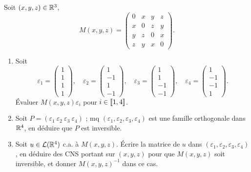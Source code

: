 

\begin{statementbox}
Soit $(x,y,z)\in\mathbb R^3$,
\[
M(x,y,z)=
\begin{pmatrix}
0&x&y&z\\
x&0&z&y\\
y&z&0&x\\
z&y&x&0
\end{pmatrix}.
\]

\begin{enumerate}[label=\alph*)]
  \item Soit
  \[
  \varepsilon_1=\begin{pmatrix}1\\1\\1\\1\end{pmatrix},\quad
  \varepsilon_2=\begin{pmatrix}1\\-1\\1\\-1\end{pmatrix},\quad
  \varepsilon_3=\begin{pmatrix}1\\1\\-1\\-1\end{pmatrix},\quad
  \varepsilon_4=\begin{pmatrix}1\\-1\\-1\\1\end{pmatrix}.
  \]
  Évaluer $M(x,y,z)\varepsilon_i$ pour $i\in\llbracket 1,4\rrbracket$.

  \item Soit $P=(\varepsilon_1\ \varepsilon_2\ \varepsilon_3\ \varepsilon_4)$ ; mq
  $(\varepsilon_1,\varepsilon_2,\varepsilon_3,\varepsilon_4)$ est une famille orthogonale
  dans $\mathbb R^4$, en déduire que $P$ est inversible.

  \item Soit $u\in\mathcal L(\mathbb R^4)$ c.a. à $M(x,y,z)$. Écrire la matrice de $u$ dans
  $(\varepsilon_1,\varepsilon_2,\varepsilon_3,\varepsilon_4)$, en déduire des CNS portant
  sur $(x,y,z)$ pour que $M(x,y,z)$ soit inversible, et donner $M(x,y,z)^{-1}$ dans ce cas.
\end{enumerate}
\end{statementbox}

